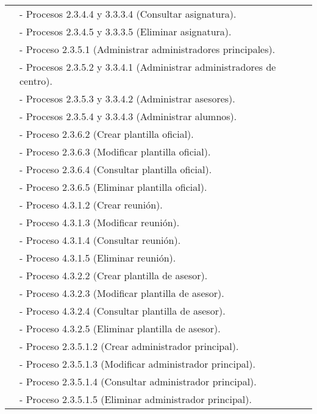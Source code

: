 \begin{center}
\begin{longtable}{| l | p{9cm} |}
                          & - Procesos 2.3.4.4 y 3.3.3.4 (Consultar asignatura).\\
                          & - Procesos 2.3.4.5 y 3.3.3.5 (Eliminar asignatura).\\
                          & - Proceso 2.3.5.1 (Administrar administradores principales).\\
                          & - Procesos 2.3.5.2 y 3.3.4.1 (Administrar administradores de centro).\\
                          & - Procesos 2.3.5.3 y 3.3.4.2 (Administrar asesores).\\
                          & - Procesos 2.3.5.4 y 3.3.4.3 (Administrar alumnos).\\
                          & - Proceso 2.3.6.2 (Crear plantilla oficial).\\
                          & - Proceso 2.3.6.3 (Modificar plantilla oficial).\\
                          & - Proceso 2.3.6.4 (Consultar plantilla oficial).\\
                          & - Proceso 2.3.6.5 (Eliminar plantilla oficial).\\
                          & - Proceso 4.3.1.2 (Crear reunión).\\
                          & - Proceso 4.3.1.3 (Modificar reunión).\\
                          & - Proceso 4.3.1.4 (Consultar reunión).\\
                          & - Proceso 4.3.1.5 (Eliminar reunión).\\
                          & - Proceso 4.3.2.2 (Crear plantilla de asesor).\\
                          & - Proceso 4.3.2.3 (Modificar plantilla de asesor).\\
                          & - Proceso 4.3.2.4 (Consultar plantilla de asesor).\\
                          & - Proceso 4.3.2.5 (Eliminar plantilla de asesor).\\
                          & - Proceso 2.3.5.1.2 (Crear administrador principal).\\
                          & - Proceso 2.3.5.1.3 (Modificar administrador principal).\\
                          & - Proceso 2.3.5.1.4 (Consultar administrador principal).\\
                          & - Proceso 2.3.5.1.5 (Eliminar administrador principal).\\

\end{longtable}
\end{center}
